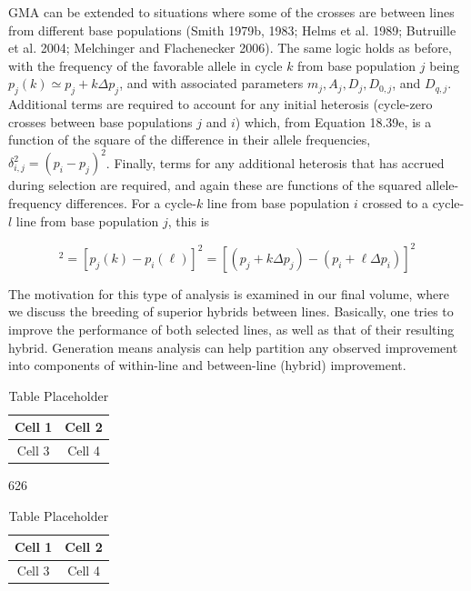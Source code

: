 \documentclass{article}
\begin{document}
GMA can be extended to situations where some of the crosses are between lines from different base populations (Smith 1979b, 1983; Helms et al. 1989; Butruille et al. 2004; Melchinger and Flachenecker 2006). The same logic holds as before, with the frequency of the favorable allele in cycle $k$ from base population $j$ being $p_j(k) \simeq p_j + k \Delta p_j$, and with associated parameters $m_j, A_j, D_j, D_{0,j}$, and $D_{q,j}$. Additional terms are required to account for any initial heterosis (cycle-zero crosses between base populations $j$ and $i$) which, from Equation 18.39e, is a function of the square of the difference in their allele frequencies, $\delta_{i,j}^2 = (p_i - p_j)^2$. Finally, terms for any additional heterosis that has accrued during selection are required, and again these are functions of the squared allele-frequency differences. For a cycle-$k$ line from base population $i$ crossed to a cycle-$l$ line from base population $j$, this is

\begin{equation}
[\delta_{i,j}(k,\ell)]^{2}=[p_{j}(k)-p_{i}(\ell)]^{2}=[(p_{j}+k\Delta p_{j})-(p_{i}+\ell\Delta p_{i})]^{2}
\end{equation}

The motivation for this type of analysis is examined in our final volume, where we discuss the breeding of superior hybrids between lines. Basically, one tries to improve the performance of both selected lines, as well as that of their resulting hybrid. Generation means analysis can help partition any observed improvement into components of within-line and between-line (hybrid) improvement.

\begin{table}[h]
\centering
\begin{tabular}{|c|c|}
\hline
Cell 1 & Cell 2 \\
\hline
Cell 3 & Cell 4 \\
\hline
\end{tabular}
\caption{Table Placeholder}
\end{table}

626

\begin{table}[h]
\centering
\begin{tabular}{|c|c|}
\hline
Cell 1 & Cell 2 \\
\hline
Cell 3 & Cell 4 \\
\hline
\end{tabular}
\caption{Table Placeholder}
\end{table}
\end{document}
